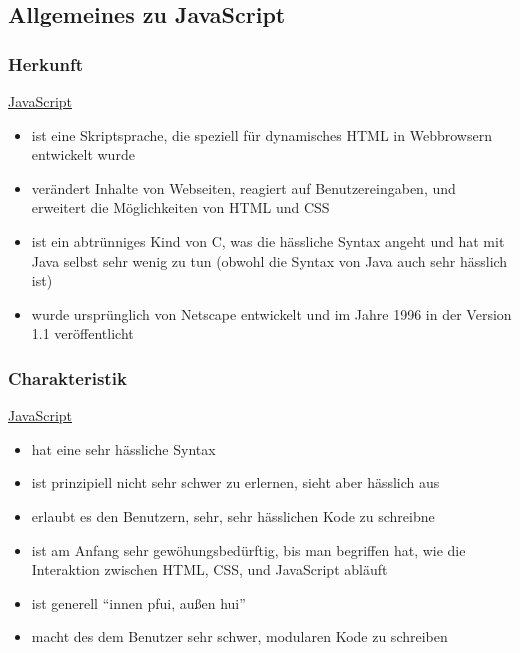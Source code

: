 
\subsection{\texorpdfstring{{Allgemeines zu
JavaScript}}{Allgemeines zu JavaScript}}

\subsubsection{\texorpdfstring{{Herkunft}}{Herkunft}}

\href{http://de.wikipedia.org/wiki/JavaScript}{JavaScript}

\begin{itemize}
\itemsep1pt\parskip0pt
\item
  {ist eine Skriptsprache, die speziell für dynamisches HTML in
  Webbrowsern entwickelt wurde}
\item
  {verändert Inhalte von Webseiten, reagiert auf Benutzereingaben, und
  erweitert die Möglichkeiten von HTML und CSS}
\item
  {ist ein abtrünniges Kind von C, was die hässliche Syntax angeht und
  hat mit Java selbst sehr wenig zu tun (obwohl die Syntax von Java auch
  sehr hässlich ist)}
\item
  {wurde ursprünglich von Netscape entwickelt und im Jahre 1996 in der
  Version 1.1 veröffentlicht}
\end{itemize}


\subsubsection{\texorpdfstring{{Charakteristik}}{Charakteristik}}

\href{http://de.wikipedia.org/wiki/JavaScript}{JavaScript}

\begin{itemize}
\itemsep1pt\parskip0pt
\item
  {hat eine sehr hässliche Syntax}
\item
  {ist prinzipiell nicht sehr schwer zu erlernen, sieht aber hässlich
  aus}
\item
  {erlaubt es den Benutzern, sehr, sehr hässlichen Kode zu schreibne}
\item
  {ist am Anfang sehr gewöhungsbedürftig, bis man begriffen hat, wie die
  Interaktion zwischen HTML, CSS, und JavaScript abläuft}
\item
  {ist generell ``innen pfui, außen hui''}
\item
  {macht des dem Benutzer sehr schwer, modularen Kode zu schreiben}
\end{itemize}


